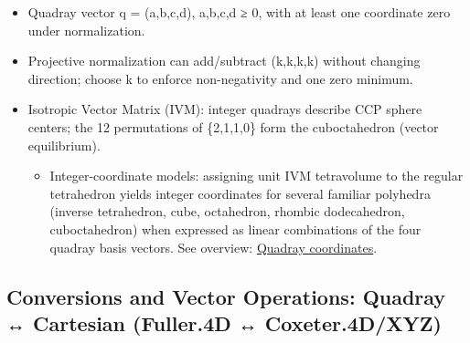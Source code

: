 \documentclass[
  10pt,
]{article}
\providecommand{\tightlist}{%
  \setlength{\itemsep}{0pt}\setlength{\parskip}{0pt}}
\begin{document}
\begin{itemize}
\tightlist
\item
  Quadray vector q = (a,b,c,d), a,b,c,d ≥ 0, with at least one
  coordinate zero under normalization.
\item
  Projective normalization can add/subtract (k,k,k,k) without changing
  direction; choose k to enforce non-negativity and one zero minimum.
\item
  Isotropic Vector Matrix (IVM): integer quadrays describe CCP sphere
  centers; the 12 permutations of \{2,1,1,0\} form the cuboctahedron
  (vector equilibrium).

  \begin{itemize}
  \tightlist
  \item
    Integer-coordinate models: assigning unit IVM tetravolume to the
    regular tetrahedron yields integer coordinates for several familiar
    polyhedra (inverse tetrahedron, cube, octahedron, rhombic
    dodecahedron, cuboctahedron) when expressed as linear combinations
    of the four quadray basis vectors. See overview:
    \href{https://en.wikipedia.org/wiki/Quadray_coordinates}{Quadray
    coordinates}.
  \end{itemize}
\end{itemize}

\hypertarget{conversions-and-vector-operations-quadray-cartesian-fuller.4d-coxeter.4dxyz}{%
\subsection{Conversions and Vector Operations: Quadray ↔ Cartesian
(Fuller.4D ↔
Coxeter.4D/XYZ)}\label{conversions-and-vector-operations-quadray-cartesian-fuller.4d-coxeter.4dxyz}}
\end{document}
